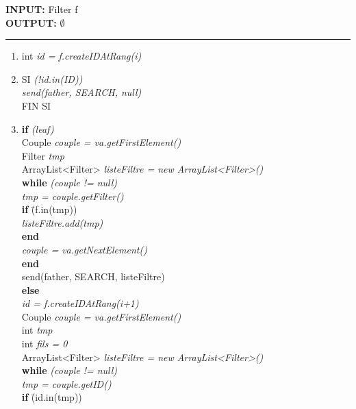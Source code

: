 \documentclass[a4paper,11pt]{report}
\begin{document}
\begin{flushleft}
	\begin{framed}
		\textbf{INPUT:} Filter f\\
		\textbf{OUTPUT:} $\emptyset$
		\noindent\rule{\linewidth}{0.5pt}

		\begin{enumerate}
			\item int \textit{id = f.createIDAtRang(i)}
			\item
			\begin{tabbing}
				SI \= \textit{(!id.in(ID))}\\
					\> \textit{send(father, SEARCH, null)}\\
				FIN SI
			\end{tabbing}
			\item 
			\begin{tabbing}
				\textbf{if} \= \textit{(leaf)}\\
					\> Couple \textit{couple = va.getFirstElement()}\\
					\> Filter \textit{tmp}\\
					\> ArrayList<Filter> \textit{listeFiltre = new ArrayList<Filter>()}\\
					\> \textbf{while} \= \textit{(couple != null)}\\
					\> \> \textit{tmp = couple.getFilter()}\\
					\> \> \textbf{if} \= (f.in(tmp)) \\
					\> \> \> \textit{listeFiltre.add(tmp)}\\
					\> \> \textbf{end}\\
					\> \> \textit{couple = va.getNextElement()}\\
					\> \textbf{end}\\ 
					\> send(father, SEARCH, listeFiltre)\\
				\textbf{else}\\
					\> \textit{id = f.createIDAtRang(i+1)}\\
					\> Couple \textit{couple = va.getFirstElement()}\\
					\> int \textit{tmp}\\
					\> int \textit{fils = 0}\\
					\> ArrayList<Filter> \textit{listeFiltre = new ArrayList<Filter>()}\\
					\> \textbf{while} \= \textit{(couple != null)}\\
					\> \> \textit{tmp = couple.getID()}\\
					\> \> \textbf{if} \= (id.in(tmp)) \\

\end{tabbing}
\end{enumerate}
\end{framed}
\end{flushleft}
\end{document}
